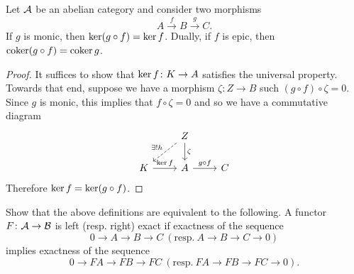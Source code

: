\documentclass[reqno, 12pt]{amsart}
\begin{document}
\begin{lemma}
  Let $\mathcal{A}$ be an abelian category and consider two morphisms
  $$A \overset{f} \to B \overset{g} \to C.$$
  If $g$ is monic, then $\operatorname{ker}(g \circ f) = \operatorname{ker} f$.
  Dually, if $f$ is epic, then $\operatorname{coker}(g \circ f) = \operatorname{coker} g$.
\end{lemma}
\begin{proof}
  It suffices to show that $\operatorname{ker} f \colon K \to A$ satisfies the universal property.
  Towards that end, suppose we have a morphism $\zeta \colon Z \to B$ such $(g \circ f) \circ \zeta = 0$.
  Since $g$ is monic, this implies that $f \circ \zeta = 0$ and so we have a commutative diagram
  $$\begin{tikzcd}
    &Z\arrow{d}{\zeta}\arrow[dashed,swap]{ld}{\exists !h}\\
    K \arrow{r}{\op{ker} f} &A \arrow{r}{g \circ f} & C
  \end{tikzcd}$$
  Therefore $\operatorname{ker} f = \operatorname{ker}(g \circ f)$.
\end{proof}

\begin{exercise}
  Show that the above definitions are equivalent to the following.
  A functor $F \colon \mathcal{A} \to \mathcal{B}$ is left (resp. right) exact if exactness of the sequence
  $$0 \to A \to B \to C\ (\text{resp.}\ A \to B \to C \to 0)$$
  implies exactness of the sequence
  $$0 \to FA \to FB \to FC\ (\text{resp.}\ FA \to FB \to FC \to 0).$$
\end{exercise}
\end{document}
